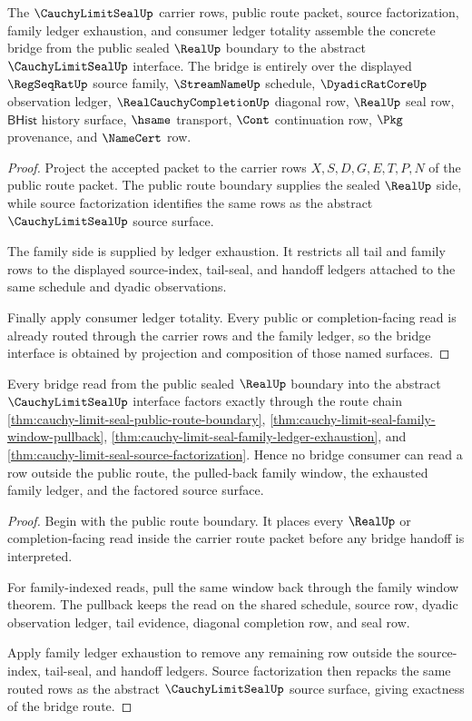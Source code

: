 \begin{theorem}
\label{thm:cauchy-limit-seal-bridge-interface}
The $\CauchyLimitSealUp$ carrier rows, public route packet, source factorization, family ledger exhaustion, and consumer ledger totality assemble the concrete bridge from the public sealed $\RealUp$ boundary to the abstract $\CauchyLimitSealUp$ interface. The bridge is entirely over the displayed $\RegSeqRatUp$ source family, $\StreamNameUp$ schedule, $\DyadicRatCoreUp$ observation ledger, $\RealCauchyCompletionUp$ diagonal row, $\RealUp$ seal row, $\mathsf{BHist}$ history surface, $\hsame$ transport, $\Cont$ continuation row, $\Pkg$ provenance, and $\NameCert$ row.
\end{theorem}
\begin{proof}
Project the accepted packet to the carrier rows $X,S,D,G,E,T,P,N$ of the public route packet. The public route boundary supplies the sealed $\RealUp$ side, while source factorization identifies the same rows as the abstract $\CauchyLimitSealUp$ source surface.

The family side is supplied by ledger exhaustion. It restricts all tail and family rows to the displayed source-index, tail-seal, and handoff ledgers attached to the same schedule and dyadic observations.

Finally apply consumer ledger totality. Every public or completion-facing read is already routed through the carrier rows and the family ledger, so the bridge interface is obtained by projection and composition of those named surfaces.
\end{proof}

\begin{theorem}
\label{thm:cauchy-limit-seal-bridge-route-exactness}
Every bridge read from the public sealed $\RealUp$ boundary into the abstract $\CauchyLimitSealUp$ interface factors exactly through the route chain
\autoref{thm:cauchy-limit-seal-public-route-boundary}, \autoref{thm:cauchy-limit-seal-family-window-pullback}, \autoref{thm:cauchy-limit-seal-family-ledger-exhaustion}, and \autoref{thm:cauchy-limit-seal-source-factorization}. Hence no bridge consumer can read a row outside the public route, the pulled-back family window, the exhausted family ledger, and the factored source surface.
\end{theorem}
\begin{proof}
Begin with the public route boundary. It places every $\RealUp$ or completion-facing read inside the carrier route packet before any bridge handoff is interpreted.

For family-indexed reads, pull the same window back through the family window theorem. The pullback keeps the read on the shared schedule, source row, dyadic observation ledger, tail evidence, diagonal completion row, and seal row.

Apply family ledger exhaustion to remove any remaining row outside the source-index, tail-seal, and handoff ledgers. Source factorization then repacks the same routed rows as the abstract $\CauchyLimitSealUp$ source surface, giving exactness of the bridge route.
\end{proof}

